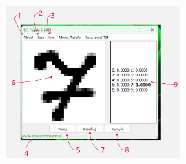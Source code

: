 \documentclass{article}
\begin{document}
\begin{figure}[H]
    \centering
    \includegraphics[width=0.6\textwidth]{img/gui.png}
\end{figure}
\end{document}

